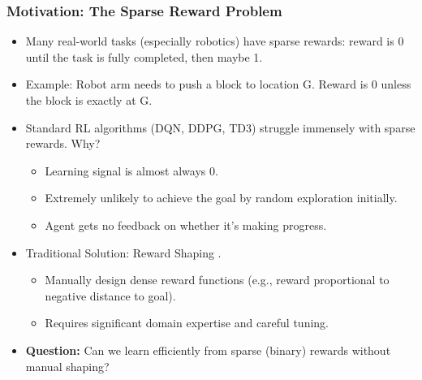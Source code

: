 \documentclass[9pt, aspectratio=169]{beamer}
\begin{document}
\begin{frame}
  \frametitle{Motivation: The Sparse Reward Problem}
    \begin{itemize}
        \item Many real-world tasks (especially robotics) have sparse rewards: reward is 0 until the task is fully completed, then maybe 1.
        \item Example: Robot arm needs to push a block to location G. Reward is 0 unless the block is exactly at G.
        \item Standard RL algorithms (DQN, DDPG, TD3) struggle immensely with sparse rewards. Why?
        \begin{itemize}
            \item Learning signal is almost always 0.
            \item Extremely unlikely to achieve the goal by random exploration initially.
            \item Agent gets no feedback on whether it's making progress.
        \end{itemize}

        \item Traditional Solution: Reward Shaping \cite{10.5555/645528.657613}.
            \begin{itemize}
                \item Manually design dense reward functions (e.g., reward proportional to negative distance to goal).
                \item Requires significant domain expertise and careful tuning.
            \end{itemize}

        \item \textbf{Question:} Can we learn efficiently from sparse (binary) rewards without manual shaping?
    \end{itemize}
\end{frame}
\end{document}
